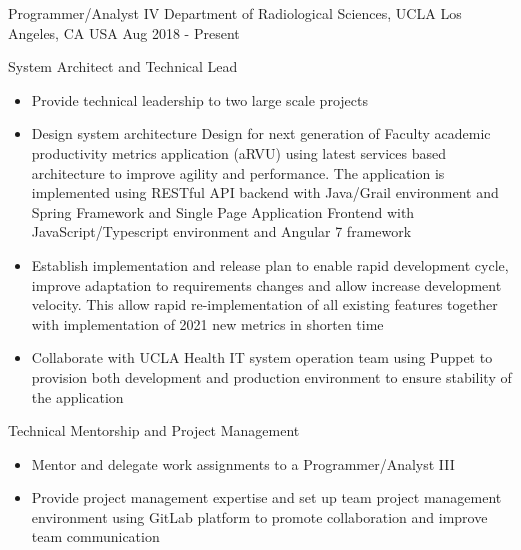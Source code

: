 


\begin{cventries}


	
  \cventry
    {Programmer/Analyst IV} %
    {Department of Radiological Sciences, UCLA} %
    {Los Angeles, CA USA} %
    {Aug 2018 - Present} %
    {
      \begin{cvitems} %
        \item[] {System Architect and Technical Lead
            \begin{itemize} %
                \item {Provide technical leadership to two large scale projects}
                \item {Design system architecture Design for next generation of Faculty academic productivity metrics application (aRVU) using latest services based architecture to improve agility and performance. The application is implemented using RESTful API backend with Java/Grail environment and Spring Framework and Single Page Application Frontend with JavaScript/Typescript environment and Angular 7 framework}
                \item {Establish implementation and release plan to enable rapid development cycle, improve adaptation to requirements changes and allow increase development velocity. This allow rapid re-implementation of all existing features together with implementation of 2021 new metrics in shorten time}
                \item {Collaborate with UCLA Health IT system operation team using Puppet to provision both development and production environment to ensure stability of the application}
              \end{itemize}}
        \item[] {Technical Mentorship and Project Management 
            \begin{itemize} %
                \item {Mentor and delegate work assignments to a Programmer/Analyst III}
                \item {Provide project management expertise and set up team project management environment using GitLab platform to promote collaboration and improve team communication}
              \end{itemize}}
      \end{cvitems}
    }



\end{cventries}
